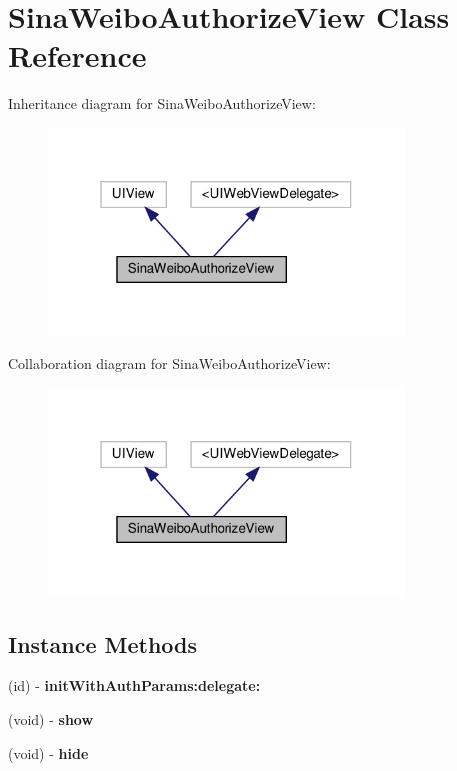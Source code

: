 \hypertarget{interfaceSinaWeiboAuthorizeView}{}\section{Sina\+Weibo\+Authorize\+View Class Reference}
\label{interfaceSinaWeiboAuthorizeView}


Inheritance diagram for Sina\+Weibo\+Authorize\+View\+:
\nopagebreak
\begin{figure}[H]
\begin{center}
\leavevmode
\includegraphics[width=268pt]{interfaceSinaWeiboAuthorizeView__inherit__graph}
\end{center}
\end{figure}


Collaboration diagram for Sina\+Weibo\+Authorize\+View\+:
\nopagebreak
\begin{figure}[H]
\begin{center}
\leavevmode
\includegraphics[width=268pt]{interfaceSinaWeiboAuthorizeView__coll__graph}
\end{center}
\end{figure}
\subsection*{Instance Methods}
\begin{DoxyCompactItemize}
\item 
\mbox{\label{interfaceSinaWeiboAuthorizeView_a1c707a575b9124b4dfae067a33bbdf48}} 
(id) -\/ {\bfseries init\+With\+Auth\+Params\+:delegate\+:}
\item 
\mbox{\label{interfaceSinaWeiboAuthorizeView_aae5f0f785a8ae0b3162e7062b552034f}} 
(void) -\/ {\bfseries show}
\item 
\mbox{\label{interfaceSinaWeiboAuthorizeView_aadf97c5f5201bab5f123dd63aeb3d350}} 
(void) -\/ {\bfseries hide}
\end{DoxyCompactItemize}
